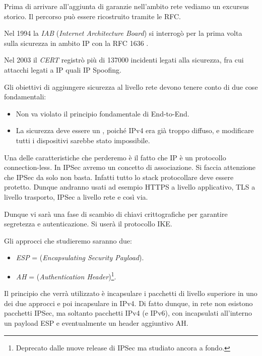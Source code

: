 \documentclass[14pt]{extreport}
\begin{document}
Prima di arrivare all'aggiunta di garanzie nell'ambito rete vediamo un excursus storico. Il percorso può essere ricostruito tramite le RFC.

Nel 1994 la \textit{IAB} (\textit{Internet Architecture Board}) si interrogò per la prima volta sulla sicurezza in ambito IP con la RFC 1636 .

Nel 2003 il \textit{CERT} registrò più di 137000 incidenti legati alla sicurezza, fra cui attacchi legati a IP quali IP Spoofing.

Gli obiettivi di aggiungere sicurezza al livello rete devono tenere conto di due cose fondamentali:


\begin{itemize}
    \item Non va violato il principio fondamentale di End-to-End.
    
    \item La sicurezza deve essere un , poiché IPv4 era già troppo diffuso, e modificare tutti i dispositivi sarebbe stato impossibile.
\end{itemize}

Una delle caratteristiche che perderemo è il fatto che IP è un protocollo connection-less. In IPSec avremo un concetto di associazione. 
Si faccia attenzione che IPSec da solo non basta. Infatti tutto lo stack protocollare deve essere protetto. Dunque andranno usati ad esempio HTTPS a livello applicativo, TLS a livello trasporto, IPSec a livello rete e così via.

Dunque vi sarà una fase di scambio di chiavi crittografiche per garantire segretezza e autenticazione. Si userà il protocollo IKE.

Gli approcci che studieremo saranno due:


\begin{itemize}
    \item \textit{ESP} = (\textit{Encapsulating Security Payload}).
    
    
    \item \textit{AH} = (\textit{Authentication Header})\footnote{Deprecato dalle nuove release di IPSec ma studiato ancora a fondo.}.
\end{itemize}

Il principio che verrà utilizzato è incapsulare i pacchetti di livello superiore in uno dei due approcci e poi incapsulare in IPv4. Di fatto dunque, in rete non esistono pacchetti IPSec, ma soltanto pacchetti IPv4 (e IPv6), con incapsulati all'interno un payload ESP e eventualmente un header aggiuntivo AH.
\end{document}

